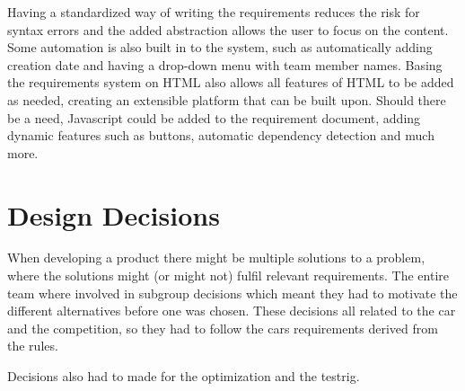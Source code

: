 Having a standardized way of writing the requirements reduces the risk for
syntax errors and the added abstraction allows the user to focus on the content.
Some automation is also built in to the system, such as automatically adding
creation date and having a drop-down menu with team member names. Basing the
requirements system on HTML also allows all features of HTML to be added as
needed, creating an extensible platform that can be built upon. Should there be
a need, Javascript could be added to the requirement document, adding dynamic
features such as buttons, automatic dependency detection and much more.

\section{Design Decisions}
When developing a product there might be multiple solutions to a problem, 
where the solutions might (or might not) fulfil relevant requirements. 
The entire team where involved in subgroup decisions which meant they had to motivate
the different alternatives before one was chosen. These decisions all related to the 
car and the competition, so they had to follow the cars requirements derived from the rules.

Decisions also had to made for the optimization and the testrig.

